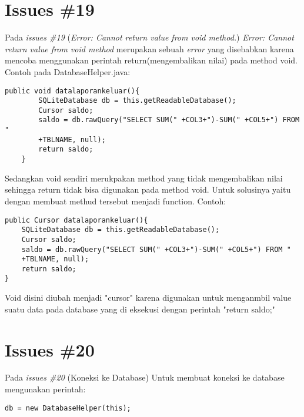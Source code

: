 \section{Issues \#19}
Pada \textit{issues \#19} (\textit{Error: Cannot return value from void method.}) \textit{Error: Cannot return value from void method} merupakan sebuah \textit{error} yang disebabkan karena mencoba menggunakan perintah return(mengembalikan nilai) pada method void. Contoh pada DatabaseHelper.java:
\begin{verbatim}
public void datalaporankeluar(){ 
        SQLiteDatabase db = this.getReadableDatabase();
        Cursor saldo;
        saldo = db.rawQuery("SELECT SUM(" +COL3+")-SUM(" +COL5+") FROM "
        +TBLNAME, null);
        return saldo;
    }
\end{verbatim}
Sedangkan void sendiri merukpakan method yang tidak mengembalikan nilai sehingga return tidak bisa digunakan pada method void. Untuk solusinya yaitu dengan membuat methud tersebut menjadi function. Contoh: 
\begin{verbatim}
public Cursor datalaporankeluar(){ 
    SQLiteDatabase db = this.getReadableDatabase();
    Cursor saldo;
    saldo = db.rawQuery("SELECT SUM(" +COL3+")-SUM(" +COL5+") FROM "
    +TBLNAME, null);
    return saldo;
}
\end{verbatim}
Void disini diubah menjadi "cursor" karena digunakan untuk menganmbil value suatu data pada database yang di eksekusi dengan perintah "return saldo;"

\section{Issues \#20}
Pada \textit{issues \#20} (Koneksi ke Database) Untuk membuat koneksi ke database mengunakan perintah:
\begin{verbatim}
db = new DatabaseHelper(this);
\end{verbatim}